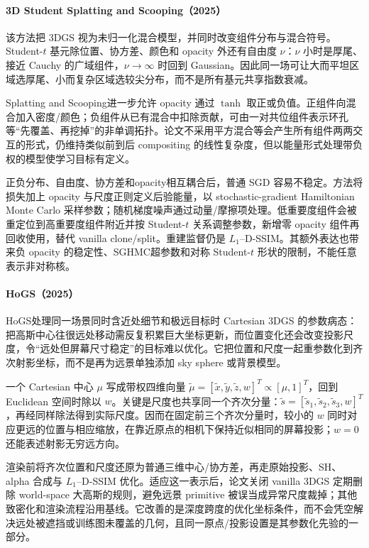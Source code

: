 \paragraph{3D Student Splatting and Scooping（2025）\cite{2503_10148}}
该方法把 3DGS 视为未归一化混合模型，并同时改变组件分布与混合符号。Student-$t$ 基元除位置、协方差、颜色和 opacity 外还有自由度 $\nu$：$\nu$ 小时是厚尾、接近 Cauchy 的广域组件，$\nu\to\infty$ 时回到 Gaussian。因此同一场可让大而平坦区域选厚尾、小而复杂区域选较尖分布，而不是所有基元共享指数衰减。

Splatting and Scooping进一步允许 opacity 通过 $\tanh$ 取正或负值。正组件向混合加入密度/颜色；负组件从已有混合中扣除贡献，可由一对共位组件表示环孔等“先覆盖、再挖掉”的非单调拓扑。论文不采用平方混合等会产生所有组件两两交互的形式，仍维持类似前到后 compositing 的线性复杂度，但以能量形式处理带负权的模型使学习目标有定义。

正负分布、自由度、协方差和opacity相互耦合后，普通 SGD 容易不稳定。方法将损失加上 opacity 与尺度正则定义后验能量，以 stochastic-gradient Hamiltonian Monte Carlo 采样参数；随机梯度噪声通过动量/摩擦项处理。低重要度组件会被重定位到高重要度组件附近并按 Student-$t$ 关系调整参数，新增零 opacity 组件再回收使用，替代 vanilla clone/split。重建监督仍是 $L_1$--D-SSIM。其额外表达也带来负 opacity 的稳定性、SGHMC超参数和对称 Student-$t$ 形状的限制，不能任意表示非对称核。

\paragraph{HoGS（2025）\cite{2503_19232}}
HoGS处理同一场景同时含近处细节和极远目标时 Cartesian 3DGS 的参数病态：把高斯中心往很远处移动需反复积累巨大坐标更新，而位置变化还会改变投影尺度，令“远处但屏幕尺寸稳定”的目标难以优化。它把位置和尺度一起重参数化到齐次射影坐标，而不是再为远景单独添加 sky sphere 或背景模型。

一个 Cartesian 中心 $\mu$ 写成带权四维向量 $\tilde\mu=[\tilde x,\tilde y,\tilde z,w]^T\propto[\mu,1]^T$，回到 Euclidean 空间时除以 $w$。关键是尺度也共享同一个齐次分量：$\tilde s=[\tilde s_1,\tilde s_2,\tilde s_3,w]^T$，再经同样除法得到实际尺度。因而在固定前三个齐次分量时，较小的 $w$ 同时对应更远的位置与相应缩放，在靠近原点的相机下保持近似相同的屏幕投影；$w=0$ 还能表述射影无穷远方向。

渲染前将齐次位置和尺度还原为普通三维中心/协方差，再走原始投影、SH、alpha 合成与 $L_1$--D-SSIM 优化。适应这一表示后，论文关闭 vanilla 3DGS 定期删除 world-space 大高斯的规则，避免远景 primitive 被误当成异常尺度裁掉；其他致密化和渲染流程沿用基线。它改善的是深度跨度的优化坐标条件，而不会凭空解决远处被遮挡或训练图未覆盖的几何，且同一原点/投影设置是其参数化先验的一部分。

